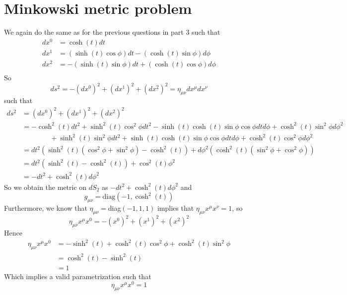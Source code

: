 \documentclass{article}
\begin{document}
	\section{Minkowski metric problem}
		We again do the same as for the previous questions in part 3 such that
		\begin{align*}
			dx^0 &= \cosh(t) dt \\
			dx^1 &= (\sinh(t)\cos \phi) dt - (\cosh (t)\sin \phi)d \phi \\
			dx^2 &= -(\sinh (t) \sin \phi) dt + (\cosh (t) \cos \phi) d \phi \\
		\end{align*}
		So $$ ds^2 = - (dx^0)^2 + (dx^1)^2+(dx^2)^2 = \eta_{\mu\nu} dx^\mu dx^\nu$$
		such that
		\begin{align*}
			ds^2 &= (dx^0)^2+(dx^1)^2+(dx^2)^2 \\
			&= -\cosh^2 (t) dt^2 + \sinh^2 (t) \cos^2 \phi dt^2 - \sinh (t) \cosh (t) \sin \phi \cos \phi dt d\phi + \cosh^2 (t) \sin^2 \phi d\phi^2  \\
			&\quad\quad\quad\quad + \sinh^2 (t) \sin^2 \phi dt^2 + \sinh (t) \cosh (t) \sin \phi \cos \phi dt d\phi + \cosh^2 (t) \cos^2 \phi d\phi^2\\
			&= dt^2 \left( \sinh^2 (t) (\cos^2 \phi + \sin^2 \phi) - \cosh^2 (t) \right) + d\phi^2 \left( \cosh^2 (t) (\sin^2 \phi + \cos^2 \phi) \right) \\
			&= dt^2 \left( \sinh^2(t) - \cosh^2 (t) \right) + \cos^2 (t) \phi^2 \\
			&= -dt^2 + \cosh^2(t) d\phi^2
		\end{align*}
		So we obtain the metric on $dS_2$ as $-dt^2 + \cosh^2(t) d\phi^2$ and
		$$ g_{\mu\nu} = \text{diag}(-1,\cosh^2(t))$$
		Furthermore, we know that $\eta_{\mu\nu} =$diag$(-1,1,1)$ implies that $\eta_{\mu\nu} x^\mu x^\nu = 1$, so
		$$ \eta_{\mu\nu} x^\mu x^0 = -(x^0)^2 + (x^1)^2 + (x^2)^2$$
		Hence
		\begin{align*}
			\eta_{\mu\nu} x^\mu x^0 &= - \sinh^2 (t) + \cosh^2(t) \cos^2 \phi + \cosh^2(t) \sin^2 \phi \\
			&= \cosh^2(t) - \sinh^2(t) \\
			&= 1
		\end{align*}
		Which implies a valid parametrization such that
		$$ \eta_{\mu\nu} x^\mu x^0 = 1 $$
		
\end{document}

